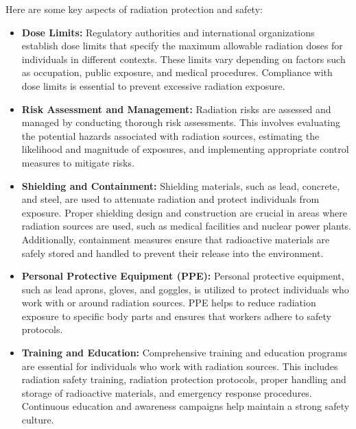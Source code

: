 \documentclass[../introduction.tex]{subfiles}
\begin{document}
        Here are some key aspects of radiation protection and safety:
        \begin{itemize}
            \item \textbf{Dose Limits:} Regulatory authorities and international organizations establish dose limits that specify the maximum 
            allowable radiation doses for individuals in different contexts. These limits vary depending on factors such as occupation, 
            public exposure, and medical procedures. Compliance with dose limits is essential to prevent excessive radiation exposure.

            \item \textbf{Risk Assessment and Management:} Radiation risks are assessed and managed by conducting thorough risk assessments. 
            This involves evaluating the potential hazards associated with radiation sources, estimating the likelihood and magnitude of 
            exposures, and implementing appropriate control measures to mitigate risks.

            \item \textbf{Shielding and Containment:} Shielding materials, such as lead, concrete, and steel, are used to attenuate radiation 
            and protect individuals from exposure. Proper shielding design and construction are crucial in areas where radiation sources are 
            used, such as medical facilities and nuclear power plants. Additionally, containment measures ensure that radioactive materials are 
            safely stored and handled to prevent their release into the environment.

            \item \textbf{Personal Protective Equipment (PPE):} Personal protective equipment, such as lead aprons, gloves, and goggles, is 
            utilized to protect individuals who work with or around radiation sources. PPE helps to reduce radiation exposure to specific body 
            parts and ensures that workers adhere to safety protocols.

            \item \textbf{Training and Education:} Comprehensive training and education programs are essential for individuals who work with 
            radiation sources. This includes radiation safety training, radiation protection protocols, proper handling and storage of 
            radioactive materials, and emergency response procedures. Continuous education and awareness campaigns help maintain a strong 
            safety culture.


\end{itemize}
\end{document}
